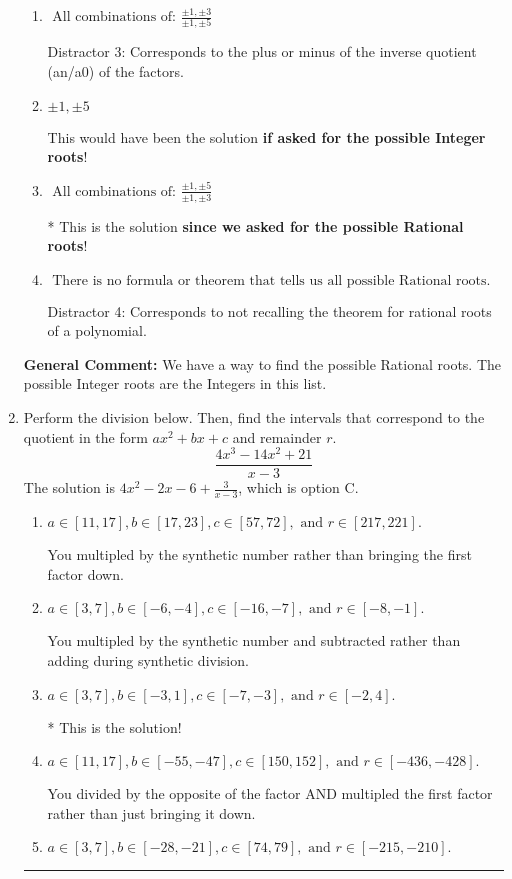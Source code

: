 \documentclass{extbook}[14pt]
\newcommand{\litem}[1]{\item #1

\rule{\textwidth}{0.4pt}}
\begin{document}
\begin{enumerate}
{\begin{enumerate}[label=\Alph*.]
 Distractor 1: Corresponds to the plus or minus factors of a1 only.
\item \( \text{ All combinations of: }\frac{\pm 1,\pm 3}{\pm 1,\pm 5} \)

 Distractor 3: Corresponds to the plus or minus of the inverse quotient (an/a0) of the factors. 
\item \( \pm 1,\pm 5 \)

This would have been the solution \textbf{if asked for the possible Integer roots}!
\item \( \text{ All combinations of: }\frac{\pm 1,\pm 5}{\pm 1,\pm 3} \)

* This is the solution \textbf{since we asked for the possible Rational roots}!
\item \( \text{ There is no formula or theorem that tells us all possible Rational roots.} \)

 Distractor 4: Corresponds to not recalling the theorem for rational roots of a polynomial.
\end{enumerate}

\textbf{General Comment:} We have a way to find the possible Rational roots. The possible Integer roots are the Integers in this list.
}
\litem{
Perform the division below. Then, find the intervals that correspond to the quotient in the form $ax^2+bx+c$ and remainder $r$.
\[ \frac{4x^{3} -14 x^{2} + 21}{x -3} \]The solution is \( 4x^{2} -2 x -6 + \frac{3}{x -3} \), which is option C.\begin{enumerate}[label=\Alph*.]
\item \( a \in [11, 17], b \in [17, 23], c \in [57, 72], \text{ and } r \in [217, 221]. \)

 You multipled by the synthetic number rather than bringing the first factor down.
\item \( a \in [3, 7], b \in [-6, -4], c \in [-16, -7], \text{ and } r \in [-8, -1]. \)

 You multipled by the synthetic number and subtracted rather than adding during synthetic division.
\item \( a \in [3, 7], b \in [-3, 1], c \in [-7, -3], \text{ and } r \in [-2, 4]. \)

* This is the solution!
\item \( a \in [11, 17], b \in [-55, -47], c \in [150, 152], \text{ and } r \in [-436, -428]. \)

 You divided by the opposite of the factor AND multipled the first factor rather than just bringing it down.
\item \( a \in [3, 7], b \in [-28, -21], c \in [74, 79], \text{ and } r \in [-215, -210]. \)


\end{enumerate}}
\end{enumerate}
\end{document}
